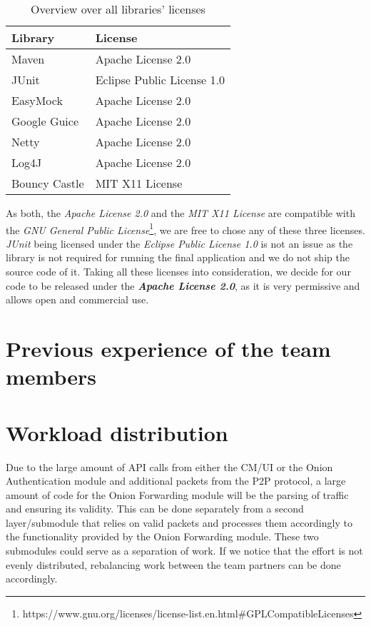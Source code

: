 \documentclass[paper=letter, fontsize=12pt]{article}
\begin{document}
\renewcommand{\arraystretch}{1.5}
\begin{table}[ht]
\centering
\caption{Overview over all libraries' licenses}
\label{tab:licenses}
\begin{tabular}{|l|l|}
\hline
\textbf{Library} & \textbf{License}           \\ \hline
Maven            & Apache License 2.0         \\ \hline
JUnit            & Eclipse Public License 1.0 \\ \hline
EasyMock         & Apache License 2.0         \\ \hline
Google Guice     & Apache License 2.0         \\ \hline
Netty            & Apache License 2.0         \\ \hline
Log4J            & Apache License 2.0         \\ \hline
Bouncy Castle    & MIT X11 License            \\ \hline
\end{tabular}
\end{table}

As both, the \emph{Apache License 2.0} and the \emph{MIT X11 License} are compatible with the \emph{GNU General Public License}\footnote{https://www.gnu.org/licenses/license-list.en.html\#GPLCompatibleLicenses}, we are free to chose any of these three licenses. \emph{JUnit} being licensed under the \emph{Eclipse Public License 1.0} is not an issue as the library is not required for running the final application and we do not ship the source code of it.
Taking all these licenses into consideration, we decide for our code to be released under the \textbf{\emph{Apache License 2.0}}, as it is very permissive and allows open and commercial use.

\section{Previous experience of the team members}

\section{Workload distribution}
Due to the large amount of API calls from either the CM/UI or the Onion Authentication module and additional packets from the P2P protocol, a large amount of code for the Onion Forwarding module will be the parsing of traffic and ensuring its validity. This can be done separately from a second layer/submodule that relies on valid packets and processes them accordingly to the functionality provided by the Onion Forwarding module. These two submodules could serve as a separation of work. If we notice that the effort is not evenly distributed, rebalancing work between the team partners can be done accordingly.
\end{document}
